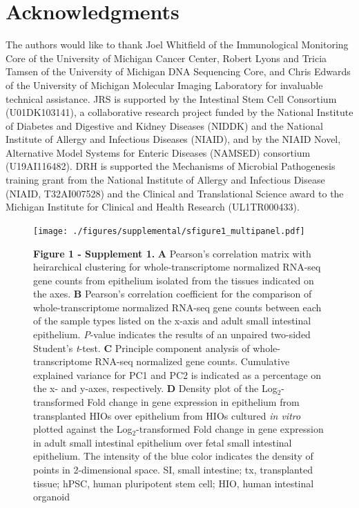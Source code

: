 \documentclass[9pt,lineo]{elife}
\begin{document}
\section*{{\bfseries\sffamily } Acknowledgments}
\label{sec:orgheadline28}
The authors would like to thank Joel Whitfield of the Immunological Monitoring Core of the University of Michigan Cancer Center, Robert Lyons and Tricia Tamsen of the University of Michigan DNA Sequencing Core, and Chris Edwards of the University of Michigan Molecular Imaging Laboratory for invaluable technical assistance.
JRS is supported by the Intestinal Stem Cell Consortium (U01DK103141), a collaborative research project funded by the National Institute of Diabetes and Digestive and Kidney Diseases (NIDDK) and the National Institute of Allergy and Infectious Diseases (NIAID), and by the NIAID Novel, Alternative Model Systems for Enteric Diseases (NAMSED) consortium (U19AI116482). DRH is supported the Mechanisms of Microbial Pathogenesis training grant from the National Institute of Allergy and Infectious Disease (NIAID, T32AI007528) and the Clinical and Translational Science award to the Michigan Institute for Clinical and Health Research (UL1TR000433). 

\nocite{*}
\begin{figure}
\begin{fullwidth}
\centering\texttt{[image: ./figures/supplemental/sfigure1\_multipanel.pdf]}
\caption*{\textbf{Figure 1 - Supplement 1. }\textbf{A} Pearson's correlation matrix with heirarchical clustering for whole-transcriptome normalized RNA-seq gene counts from epithelium isolated from the tissues indicated on the axes. \textbf{B} Pearson's correlation coefficient for the comparison of whole-transcriptome normalized RNA-seq gene counts between each of the sample types listed on the x-axis and adult small intestinal epithelium. \textit{P}-value indicates the results of an unpaired two-sided Student's \textit{t}-test. \textbf{C} Principle component analysis of whole-transcriptome RNA-seq normalized gene counts. Cumulative explained variance for PC1 and PC2 is indicated as a percentage on the x- and y-axes, respectively. \textbf{D} Density plot of the Log$_{2}$-transformed Fold change in gene expression in epithelium from transplanted HIOs over epithelium from HIOs cultured \textit{in vitro} plotted against the Log$_{2}$-transformed Fold change in gene expression in adult small intestinal epithelium over fetal small intestinal epithelium. The intensity of the blue color indicates the density of points in 2-dimensional space. SI, small intestine; tx, transplanted tissue; hPSC, human pluripotent stem cell; HIO, human intestinal organoid}
\label{fig:fullwidth}
\end{fullwidth}
\end{figure}
\end{document}
